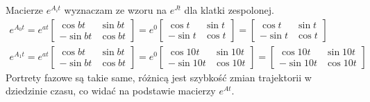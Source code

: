 \documentclass[a4paper,11pt]{article}
\begin{document}
Macierze \( e^{A_{i}t} \) wyznaczam ze wzoru na \( e^{Jt} \) dla klatki zespolonej.
\begin{align*}
e^{A_{0}t}=e^{at}
\begin{bmatrix}
\cos bt & \sin bt \\
-\sin bt & \cos bt
\end{bmatrix}
=
e^{0}
\begin{bmatrix}
\cos t & \sin t \\
-\sin t & \cos t
\end{bmatrix}
=
\begin{bmatrix}
\cos t & \sin t \\
-\sin t & \cos t
\end{bmatrix} \\
e^{A_{1}t}=e^{at}
\begin{bmatrix}
\cos bt & \sin bt \\
-\sin bt & \cos bt
\end{bmatrix}
=
e^{0}
\begin{bmatrix}
\cos 10t & \sin 10t \\
-\sin 10t & \cos 10t
\end{bmatrix}
=
\begin{bmatrix}
\cos 10t & \sin 10t \\
-\sin 10t & \cos 10t
\end{bmatrix}
\end{align*}
Portrety fazowe są takie same, różnicą jest szybkość zmian trajektorii w dziedzinie czasu, co widać na podstawie macierzy \( e^{At} \). 
\end{document}
